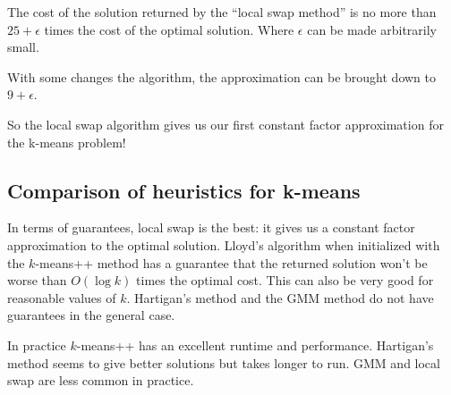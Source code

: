 \begin{theorem}
  The cost of the solution returned by the ``local swap method'' is no more than $25+\epsilon$ times the cost of the optimal solution.
  Where $\epsilon$ can be made arbitrarily small.
\end{theorem}
\begin{fact}
  With some changes the algorithm, the approximation can be brought down to $9+ \epsilon$.
\end{fact}

So the local swap algorithm gives us our first constant factor approximation for the k-means problem!

\subsection{Comparison of heuristics for k-means}
In terms of guarantees, local swap is the best: it gives us a constant factor approximation to the optimal solution. 
Lloyd's algorithm when initialized with the $k$-means++ method has a guarantee that the returned solution won't be worse than $O(\log k)$ times the optimal cost.
This can also be very good for reasonable values of $k$. Hartigan's method and the GMM method do not have guarantees in the general case.

In practice $k$-means++ has an excellent runtime and performance. Hartigan's method seems to give better solutions but takes longer to run. 
GMM and local swap are less common in practice.
	
